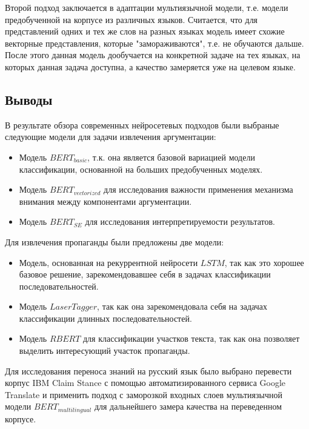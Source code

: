 Второй подход заключается в адаптации мультиязычной модели, т.е. модели предобученной на корпусе из различных языков. Считается, что для представлений одних и тех же слов на разных языках модель имеет схожие векторные представления, которые "замораживаются", т.е. не обучаются дальше. После этого данная модель дообучается на конкретной задаче на тех языках, на которых данная задача доступна, а качество замеряется уже на целевом языке.


\subsection{Выводы}

В результате обзора современных нейросетевых подходов были выбраные следующие модели для задачи извлечения аргументации:
\begin{itemize}
    \item Модель $BERT_{basic}$, т.к. она является базовой вариацией модели классификации, основанной на больших предобученных моделях.
    \item Модель $BERT_{vectorized}$ для исследования важности применения механизма внимания между компонентами аргументации.
    \item Модель $BERT_{SE}$ для исследования интерпретируемости результатов.
\end{itemize}

Для извлечения пропаганды были предложены две модели:
\begin{itemize}
    \item Модель, основанная на рекуррентной нейросети $LSTM$, так как это хорошее базовое решение, зарекомендовавшее себя в задачах классификации последовательностей.
    \item Модель $LaserTagger$, так как она зарекомендовала себя на задачах классификации длинных последовательностей.
    \item Модель $RBERT$ для классификации участков текста, так как она позволяет выделить интересующий участок пропаганды.
\end{itemize}

Для исследования переноса знаний на русский язык было выбрано перевести корпус IBM Claim Stance с помощью автоматизированного сервиса Google Translate и применить подход с заморозкой входных слоев мультиязычной модели $BERT_{multilingual}$ для дальнейшего замера качества на переведенном корпусе.